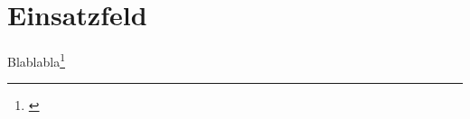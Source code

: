\section{Einsatzfeld}
\label{sec:Einsatzfeld}
\blindtext 
Blablabla\footnote{\cite[S.~20]{Reim.2015}}

\blindtext 